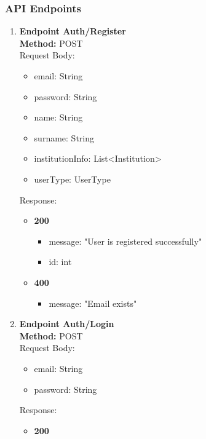 \subsubsection{API Endpoints}
\begin{enumerate}
    \item \textbf{Endpoint Auth/Register} \\
    \textbf{Method:} POST \\
    Request Body:\\
    \begin{itemize}
        \item email: String
        \item password: String
        \item name: String
        \item surname: String
        \item institutionInfo: List<Institution>
        \item userType: UserType
    \end{itemize}
    Response:\\
    \begin{itemize}
        \item \textbf{200} \\
        \begin{itemize}
            \item message: "User is registered successfully"
            \item id: int
        \end{itemize}
                \item \textbf{400} \\
        \begin{itemize}
            \item message: "Email exists"
        \end{itemize}
    \end{itemize}
    \item \textbf{Endpoint Auth/Login} \\
    \textbf{Method:} POST \\
    Request Body:\\
    \begin{itemize}
        \item email: String
        \item password: String
    \end{itemize}
    Response:\\
    \begin{itemize}
        \item \textbf{200} \\

\end{itemize}
\end{enumerate}
